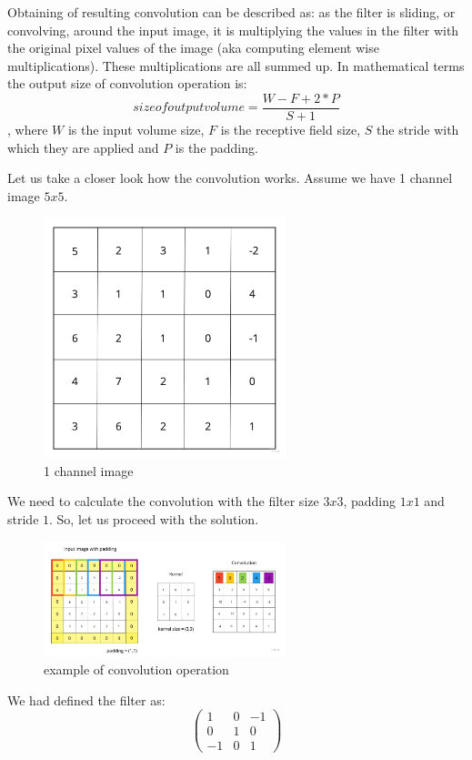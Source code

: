 Obtaining of resulting convolution can be described as: as the filter is sliding, or convolving, around the input image, it is multiplying the values in the filter with the original pixel values of the image (aka computing element wise multiplications). These multiplications are all summed up. In mathematical terms the output size of convolution operation is: \[size of output volume = \frac{W-F+2*P}{S+1} \], where $W$ is the input volume size, $F$ is the receptive field size, $S$ the stride with which they are applied and $P$ is the padding.

Let us take a closer look how the convolution works. Assume we have 1 channel image $5x5$.
\begin{figure}[h]
    \centering \includegraphics[width=7cm]{images/1_channel.jpg}
    \caption {1 channel image}
\end{figure}

We need to calculate the convolution with the filter size $3x3$, padding $1x1$ and stride $1$. So, let us proceed with the solution. 
\begin{figure}[h]
    \centering \includegraphics[width=7cm]{images/convolution.jpg}
    \caption {example of convolution operation}
\end{figure}

We had defined the filter as: 
\[ \begin{pmatrix} 1 & 0 & -1 \\ 0 & 1 & 0 \\ -1 & 0 & 1 \end{pmatrix} \]

